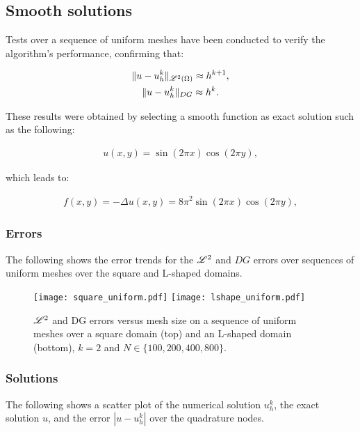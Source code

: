 \subsection{Smooth solutions}

Tests over a sequence of uniform meshes have been conducted to verify the algorithm's performance, confirming that:

\begin{gather}
    \lVert u - u^k_h \rVert_{\mathscr{L}^2(\Omega)} \approx h^{k + 1}, \\
    \lVert u - u^k_h \rVert_{DG} \approx h^k.
\end{gather}

These results were obtained by selecting a smooth function as exact solution such as the following:

\begin{gather}
    u(x, y) = \sin(2 \pi x) \cos(2 \pi y),
\end{gather}

which leads to:

\begin{gather}
    f(x, y) = -\Delta u(x, y) = 8 \pi^2 \sin(2 \pi x) \cos(2 \pi y),
\end{gather}

\newpage
\subsubsection{Errors}

The following shows the error trends for the $\mathscr{L}^2$ and $DG$ errors over sequences of uniform meshes over the square and L-shaped domains.

\begin{figure}[!ht]
	\centering
	\texttt{[image: square\_uniform.pdf]}
    \texttt{[image: lshape\_uniform.pdf]}
	\caption{$\mathscr{L}^2$ and DG errors versus mesh size on a sequence of uniform meshes over a square domain (top) and an L-shaped domain (bottom), $k = 2$ and $N \in \{100, 200, 400, 800\}$.}
\end{figure}

\newpage
\subsubsection{Solutions}

The following shows a scatter plot of the numerical solution $u^k_h$, the exact solution $u$, and the error $|u - u^k_h|$ over the quadrature nodes.

